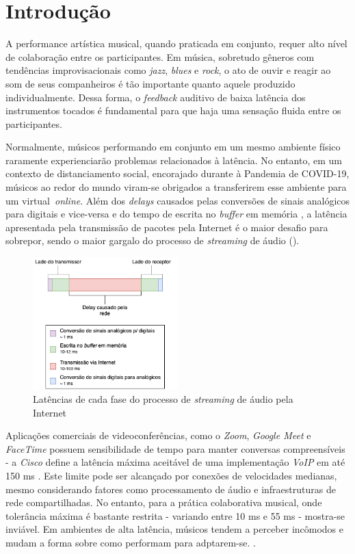 \chapter{Introdução}

A performance artística musical, quando praticada em conjunto, requer alto nível de colaboração entre os participantes. Em música, sobretudo gêneros com tendências improvisacionais como \textit{jazz}, \textit{blues} e \textit{rock}, o ato de ouvir e reagir ao som de seus companheiros é tão importante quanto aquele produzido individualmente. Dessa forma, o \textit{feedback} auditivo de baixa latência dos instrumentos tocados é fundamental para que haja uma sensação fluida entre os participantes.

Normalmente, músicos performando em conjunto em um mesmo ambiente físico raramente experienciarão problemas relacionados à latência. No entanto, em um contexto de distanciamento social, encorajado durante à Pandemia de COVID-19, músicos ao redor do mundo viram-se obrigados a transferirem esse ambiente para um virtual \textit{online}. Além dos \textit{delays} causados pelas conversões de sinais analógicos para digitais e vice-versa e do tempo de escrita no \textit{buffer} em memória \cite{how_low_can_you_go}, a latência apresentada pela transmissão de pacotes pela Internet é o maior desafio para sobrepor, sendo o maior gargalo do processo de \textit{streaming} de áudio ().

\begin{figure}[h]
\centering
\includegraphics[width=0.5\textwidth]{images/streaming-latency.png}
\caption{Latências de cada fase do processo de \textit{streaming} de áudio pela Internet}
\label{fig:streaming_latencies}
\end{figure}

Aplicações comerciais de videoconferências, como o \textit{Zoom}, \textit{Google Meet} e \textit{FaceTime}  possuem sensibilidade de tempo para manter conversas compreensíveis - a \textit{Cisco} define a latência máxima aceitável de uma implementação \textit{VoIP} em até 150 ms \cite{cisco}. Este limite pode ser alcançado por conexões de velocidades medianas, mesmo considerando fatores como processamento de áudio e infraestruturas de rede compartilhadas. No entanto, para a prática colaborativa musical, onde tolerância máxima é bastante restrita - variando entre 10 ms e 55 ms \cite{mcphearson} - mostra-se inviável. Em ambientes de alta latência, músicos tendem a perceber incômodos e mudam a forma sobre como performam para adptarem-se. \cite{carot_low_latency}.

